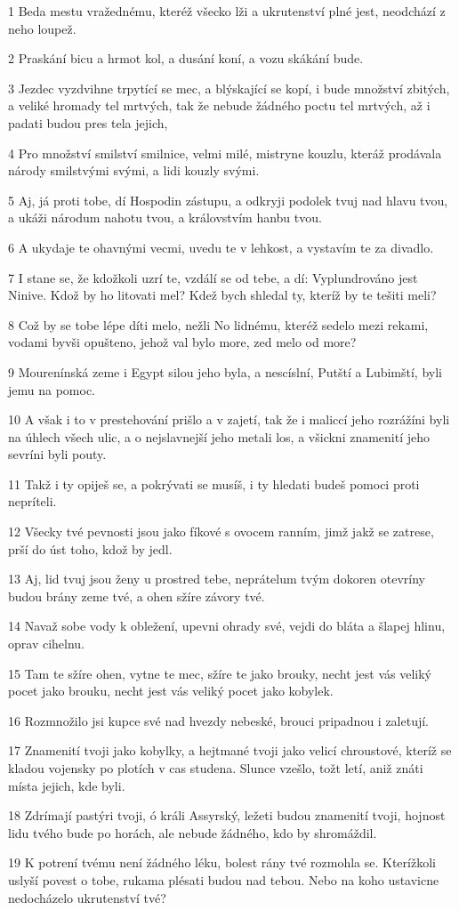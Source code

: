 \par 1 Beda mestu vražednému, kteréž všecko lži a ukrutenství plné jest, neodchází z neho loupež.
\par 2 Praskání bicu a hrmot kol, a dusání koní, a vozu skákání bude.
\par 3 Jezdec vyzdvihne trpytící se mec, a blýskající se kopí, i bude množství zbitých, a veliké hromady tel mrtvých, tak že nebude žádného poctu tel mrtvých, až i padati budou pres tela jejich,
\par 4 Pro množství smilství smilnice, velmi milé, mistryne kouzlu, kteráž prodávala národy smilstvými svými, a lidi kouzly svými.
\par 5 Aj, já proti tobe, dí Hospodin zástupu, a odkryji podolek tvuj nad hlavu tvou, a ukáži národum nahotu tvou, a královstvím hanbu tvou.
\par 6 A ukydaje te ohavnými vecmi, uvedu te v lehkost, a vystavím te za divadlo.
\par 7 I stane se, že kdožkoli uzrí te, vzdálí se od tebe, a dí: Vyplundrováno jest Ninive. Kdož by ho litovati mel? Kdež bych shledal ty, kteríž by te tešiti meli?
\par 8 Což by se tobe lépe díti melo, nežli No lidnému, kteréž sedelo mezi rekami, vodami byvši opušteno, jehož val bylo more, zed melo od more?
\par 9 Mourenínská zeme i Egypt silou jeho byla, a nescíslní, Putští a Lubimští, byli jemu na pomoc.
\par 10 A však i to v prestehování prišlo a v zajetí, tak že i maliccí jeho rozrážíni byli na úhlech všech ulic, a o nejslavnejší jeho metali los, a všickni znamenití jeho sevríni byli pouty.
\par 11 Takž i ty opiješ se, a pokrývati se musíš, i ty hledati budeš pomoci proti nepríteli.
\par 12 Všecky tvé pevnosti jsou jako fíkové s ovocem ranním, jimž jakž se zatrese, prší do úst toho, kdož by jedl.
\par 13 Aj, lid tvuj jsou ženy u prostred tebe, neprátelum tvým dokoren otevríny budou brány zeme tvé, a ohen sžíre závory tvé.
\par 14 Navaž sobe vody k obležení, upevni ohrady své, vejdi do bláta a šlapej hlinu, oprav cihelnu.
\par 15 Tam te sžíre ohen, vytne te mec, sžíre te jako brouky, necht jest vás veliký pocet jako brouku, necht jest vás veliký pocet jako kobylek.
\par 16 Rozmnožilo jsi kupce své nad hvezdy nebeské, brouci pripadnou i zaletují.
\par 17 Znamenití tvoji jako kobylky, a hejtmané tvoji jako velicí chroustové, kteríž se kladou vojensky po plotích v cas studena. Slunce vzešlo, tožt letí, aniž znáti místa jejich, kde byli.
\par 18 Zdrímají pastýri tvoji, ó králi Assyrský, ležeti budou znamenití tvoji, hojnost lidu tvého bude po horách, ale nebude žádného, kdo by shromáždil.
\par 19 K potrení tvému není žádného léku, bolest rány tvé rozmohla se. Kterížkoli uslyší povest o tobe, rukama plésati budou nad tebou. Nebo na koho ustavicne nedocházelo ukrutenství tvé?


